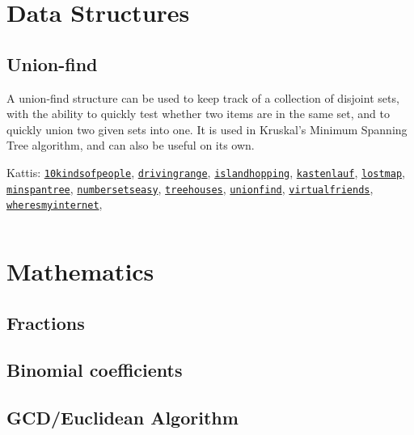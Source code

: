 \documentclass{article}
\newcommand{\code}[1]{\inputminted[fontsize=\normalsize]{java}{code/#1}}
\newcommand{\kattis}[1]{\href{https://open.kattis.com/problems/#1}{\texttt{#1}}}
\begin{document}
\section{Data Structures}

\subsection{Union-find}

A union-find structure can be used to keep track of a collection of
disjoint sets, with the ability to quickly test whether two items are
in the same set, and to quickly union two given sets into one.  It is
used in Kruskal's Minimum Spanning Tree algorithm, and can also be
useful on its own.

Kattis: \kattis{10kindsofpeople}, \kattis{drivingrange},
\kattis{islandhopping}, \kattis{kastenlauf}, \kattis{lostmap},
\kattis{minspantree}, \kattis{numbersetseasy}, \kattis{treehouses},
\kattis{unionfind}, \kattis{virtualfriends},
\kattis{wheresmyinternet},

\code{data-structures/UnionFind.java}

\section{Mathematics}

\subsection{Fractions}

\subsection{Binomial coefficients}

\subsection{GCD/Euclidean Algorithm}
\end{document}
